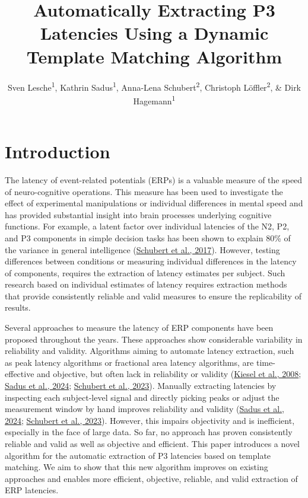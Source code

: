 \documentclass[
  man]{apa7}
\title{Automatically Extracting P3 Latencies Using a Dynamic Template Matching Algorithm}
\author{Sven Lesche\textsuperscript{1}, Kathrin Sadus\textsuperscript{1}, Anna-Lena Schubert\textsuperscript{2}, Christoph Löffler\textsuperscript{2}, \& Dirk Hagemann\textsuperscript{1}}
\date{}
\affiliation{\vspace{0.5cm}\textsuperscript{1} Heidelberg University\\\textsuperscript{2} University of Mainz}
\begin{document}
\maketitle

\hypertarget{introduction}{%
\section{Introduction}\label{introduction}}

The latency of event-related potentials (ERPs) is a valuable measure of the speed of neuro-cognitive operations. This measure has been used to investigate the effect of experimental manipulations or individual differences in mental speed and has provided substantial insight into brain processes underlying cognitive functions. For example, a latent factor over individual latencies of the N2, P2, and P3 components in simple decision tasks has been shown to explain 80\% of the variance in general intelligence (\protect\hyperlink{ref-schubert2017general}{Schubert et al., 2017}). However, testing differences between conditions or measuring individual differences in the latency of components, requires the extraction of latency estimates per subject. Such research based on individual estimates of latency requires extraction methods that provide consistently reliable and valid measures to ensure the replicability of results.

Several approaches to measure the latency of ERP components have been proposed throughout the years. These approaches show considerable variability in reliability and validity. Algorithms aiming to automate latency extraction, such as peak latency algorithms or fractional area latency algorithms, are time-effective and objective, but often lack in reliability or validity (\protect\hyperlink{ref-kiesel2008measurement}{Kiesel et al., 2008}; \protect\hyperlink{ref-sadus2024explorative}{Sadus et al., 2024}; \protect\hyperlink{ref-schubert2023robust}{Schubert et al., 2023}). Manually extracting latencies by inspecting each subject-level signal and directly picking peaks or adjust the measurement window by hand improves reliability and validity (\protect\hyperlink{ref-sadus2024explorative}{Sadus et al., 2024}; \protect\hyperlink{ref-schubert2023robust}{Schubert et al., 2023}). However, this impairs objectivity and is inefficient, especially in the face of large data. So far, no approach has proven consistently reliable and valid as well as objective and efficient. This paper introduces a novel algorithm for the automatic extraction of P3 latencies based on template matching. We aim to show that this new algorithm improves on existing approaches and enables more efficient, objective, reliable, and valid extraction of ERP latencies.
\end{document}
